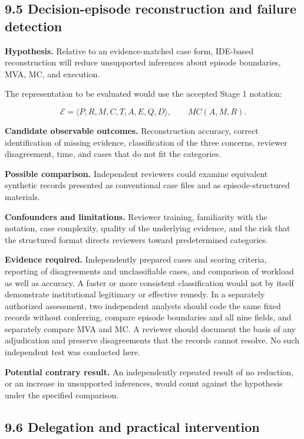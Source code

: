 \documentclass[
  10pt,
]{article}
\begin{document}
\subsection{9.5 Decision-episode reconstruction and failure
detection}\label{decision-episode-reconstruction-and-failure-detection}

\textbf{Hypothesis.} Relative to an evidence-matched case form,
IDE-based reconstruction will reduce unsupported inferences about
episode boundaries, MVA, MC, and execution.

The representation to be evaluated would use the accepted Stage 1
notation:

\[
\mathcal{E}=\langle P,R,M,C,T,A,E,Q,D\rangle,
\qquad MC(A,M,R).
\]

\textbf{Candidate observable outcomes.} Reconstruction accuracy, correct
identification of missing evidence, classification of the three
concerns, reviewer disagreement, time, and cases that do not fit the
categories.

\textbf{Possible comparison.} Independent reviewers could examine
equivalent synthetic records presented as conventional case files and as
episode-structured materials.

\textbf{Confounders and limitations.} Reviewer training, familiarity
with the notation, case complexity, quality of the underlying evidence,
and the risk that the structured format directs reviewers toward
predetermined categories.

\textbf{Evidence required.} Independently prepared cases and scoring
criteria, reporting of disagreements and unclassifiable cases, and
comparison of workload as well as accuracy. A faster or more consistent
classification would not by itself demonstrate institutional legitimacy
or effective remedy. In a separately authorized assessment, two
independent analysts should code the same fixed records without
conferring, compare episode boundaries and all nine fields, and
separately compare MVA and MC. A reviewer should document the basis of
any adjudication and preserve disagreements that the records cannot
resolve. No such independent test was conducted here.

\textbf{Potential contrary result.} An independently repeated result of
no reduction, or an increase in unsupported inferences, would count
against the hypothesis under the specified comparison.

\subsection{9.6 Delegation and practical
intervention}\label{delegation-and-practical-intervention}
\end{document}
